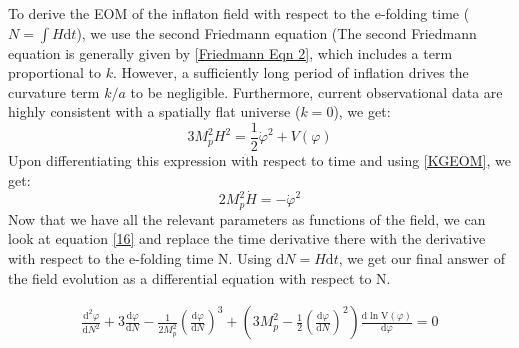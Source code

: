 \documentclass[aps,prd,reprint,preprintnumbers,showpacs,floatfix,nofootinbib,superscript address]{revtex4-2}
\begin{document}
 To derive the EOM of the inflaton field with respect to the e-folding time ($N = \int H \text{d}t$), we use the second Friedmann equation (The second Friedmann equation is generally given by \ref{Friedmann Eqn 2}, which includes a term proportional to $k$. However, a sufficiently long period of inflation drives the curvature term $k/a$ to be negligible. Furthermore, current observational data are highly consistent with a spatially flat universe ($k=0$), we get:
\begin{equation}    \label{Friedmann 3}
    3 M_p^2H^2 = \frac{1}{2} \dot{\varphi}^2 + V(\varphi)
\end{equation}
Upon differentiating this expression with respect to time and using \ref{KGEOM}, we get:
\begin{equation} \label{H vs phi}
    2 M_p^2 \dot{H} = -   \dot{\varphi}^2
\end{equation}
Now that we have all the relevant parameters as functions of the field, we can look at equation \ref{16} and replace the time derivative there with the derivative with respect to the e-folding time N. Using $\text{d}N = H \text{d}t$, we get our final answer of the field evolution as a differential equation with respect to N.
\begin{widetext}
\begin{subequations}
\begin{align}\label{phi vs N}
    \frac{\text{d}^2\varphi}{\text{d}N^2} +3 \frac{\text{d}\varphi}{\text{d}N}  - \frac{1}{2M_p^2} \left(\frac{\text{d}\varphi}{\text{d}N} \right)^3   +  \left( 3 M_p^2 - \frac{1}{2} \left(\frac{\text{d}\varphi}{\text{d}N} \right)^2 \right) \frac{\text{d}\ln \text{V}(\varphi)}{\text{d} \varphi} = 0    
\end{align}
\end{subequations}
\end{widetext}
\end{document}
